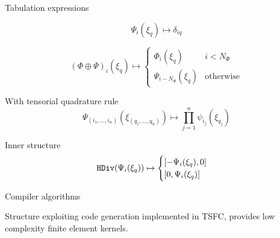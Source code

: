 \documentclass[a0paper,portrait]{baposter}
\begin{document}
\begin{poster}
\begin{posterbox}[name=structure, column=0, below=introduction,
    span=3, height=0.275,
    ]{Tabulation expressions}
\begin{tcbraster}[raster columns=6,raster equal height=rows]
\begin{tcolorbox}[title=Underintegration, raster multicolumn=2]
\begin{equation*}
          \Psi_i(\xi_q) \mapsto \delta_{iq}
        \end{equation*}
      \end{tcolorbox}
      \begin{tcolorbox}[title=Enriched, raster multicolumn=4]
        \vspace{-0.5\baselineskip}
        \begin{equation*}
          {(\Phi \oplus \Psi)}_i(\xi_q) \mapsto
          \begin{cases}
            \Phi_i(\xi_q) &\text{$i < N_\Phi$}\\
            \Psi_{i-N_\Phi}(\xi_q) &\text{otherwise}
          \end{cases}
        \end{equation*}
      \end{tcolorbox}
      \begin{tcolorbox}[title=Tensor product, raster multicolumn=3]
        With tensorial quadrature rule
        \vspace{-0.5\baselineskip}
        \begin{equation*}
          \Psi_{(i_1, \dots, i_n)}(\xi_{(q_1, \dots, q_n)}) \mapsto \prod_{j=1}^{n} \psi_{i_j}(\xi_{q_j})
        \end{equation*}
      \end{tcolorbox}
      \begin{tcolorbox}[title=$\mathbf{H}(\text{div}/\text{curl})$, raster multicolumn=3]
        Inner structure
        \vspace{-0.5\baselineskip}
        \begin{equation*}
          \text{\texttt{HDiv}}(\Psi_i(\xi_q)) \mapsto
          \begin{cases}
            [-\Psi_i(\xi_q), 0]\\
            [0, \Psi_i(\xi_q)]
          \end{cases}
        \end{equation*}
      \end{tcolorbox}
    \end{tcbraster}
  \end{posterbox}

  \begin{posterbox}[name=rules, column=0, below=structure, span=3,
    height=0.275]{Compiler algorithms}
    \raggedright
    Structure exploiting code generation implemented in TSFC,
    provides low complexity finite element kernels.
    \vspace{-\baselineskip}

\end{posterbox}
\end{poster}
\end{document}
